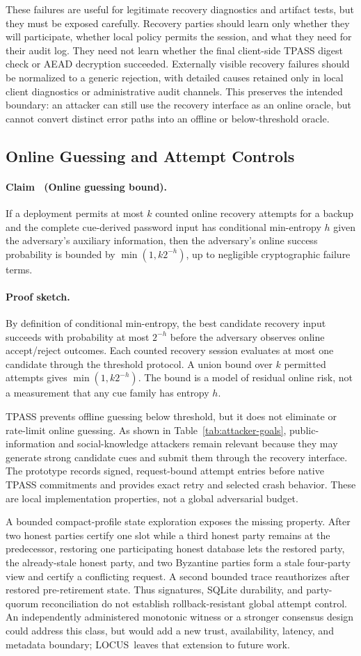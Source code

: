 \documentclass[sigconf,anonymous]{acmart}
\newcounter{protocol}
\newcommand{\LOCUS}{\textsf{LOCUS}}
\newcounter{locusclaim}
\newcommand{\locusclaim}[1]{\refstepcounter{locusclaim}\paragraph{Claim \thelocusclaim\ (#1).}}
\newcommand{\proofsketch}{\paragraph{Proof sketch.}}
\begin{document}
These failures are useful for legitimate recovery diagnostics and artifact tests, but they must be exposed carefully. Recovery parties should learn only whether they will participate, whether local policy permits the session, and what they need for their audit log. They need not learn whether the final client-side TPASS digest check or AEAD decryption succeeded. Externally visible recovery failures should be normalized to a generic rejection, with detailed causes retained only in local client diagnostics or administrative audit channels. This preserves the intended boundary: an attacker can still use the recovery interface as an online oracle, but cannot convert distinct error paths into an offline or below-threshold oracle.

\subsection{Online Guessing and Attempt Controls}

\locusclaim{Online guessing bound}
\label{claim:online-guessing}
If a deployment permits at most \(k\) counted online recovery attempts for a backup and the complete cue-derived password input has conditional min-entropy \(h\) given the adversary's auxiliary information, then the adversary's online success probability is bounded by \(\min(1,k2^{-h})\), up to negligible cryptographic failure terms.

\proofsketch
By definition of conditional min-entropy, the best candidate recovery input succeeds with probability at most \(2^{-h}\) before the adversary observes online accept/reject outcomes. Each counted recovery session evaluates at most one candidate through the threshold protocol. A union bound over \(k\) permitted attempts gives \(\min(1,k2^{-h})\). The bound is a model of residual online risk, not a measurement that any cue family has entropy \(h\).

TPASS prevents offline guessing below threshold, but it does not eliminate or rate-limit online guessing. As shown in Table~\ref{tab:attacker-goals}, public-information and social-knowledge attackers remain relevant because they may generate strong candidate cues and submit them through the recovery interface. The prototype records signed, request-bound attempt entries before native TPASS commitments and provides exact retry and selected crash behavior. These are local implementation properties, not a global adversarial budget.

A bounded compact-profile state exploration exposes the missing property. After two honest parties certify one slot while a third honest party remains at the predecessor, restoring one participating honest database lets the restored party, the already-stale honest party, and two Byzantine parties form a stale four-party view and certify a conflicting request. A second bounded trace reauthorizes after restored pre-retirement state. Thus signatures, SQLite durability, and party-quorum reconciliation do not establish rollback-resistant global attempt control. An independently administered monotonic witness or a stronger consensus design could address this class, but would add a new trust, availability, latency, and metadata boundary; \LOCUS\ leaves that extension to future work.
\end{document}
